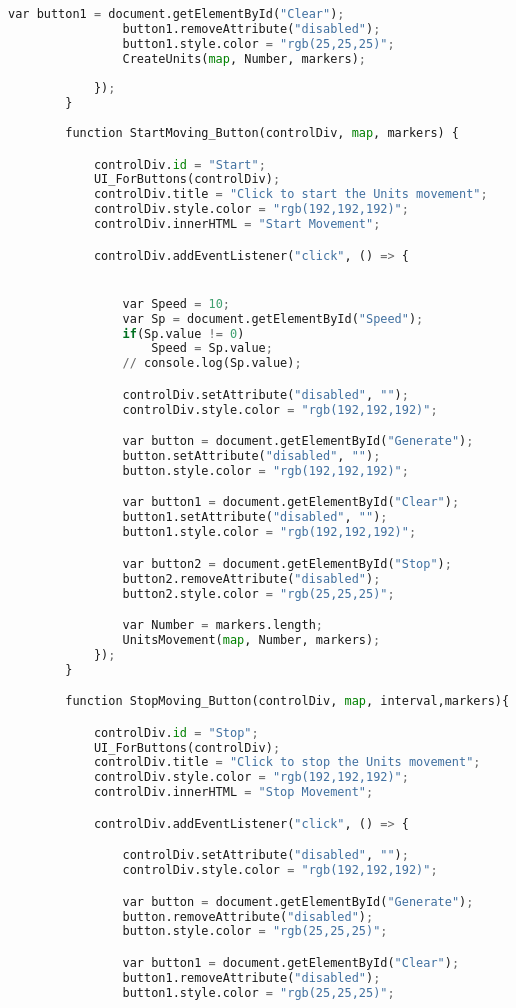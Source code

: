 \documentclass[a4paper]{article}
\begin{document}
\begin{lstlisting}[language=python,tabsize = 1,breaklines=true, breakatwhitespace=false,frame=single]
				var button1 = document.getElementById("Clear");
				button1.removeAttribute("disabled");
				button1.style.color = "rgb(25,25,25)";
				CreateUnits(map, Number, markers);
						
			});
		}
	
		function StartMoving_Button(controlDiv, map, markers) {

			controlDiv.id = "Start";
			UI_ForButtons(controlDiv);
			controlDiv.title = "Click to start the Units movement";
			controlDiv.style.color = "rgb(192,192,192)";
			controlDiv.innerHTML = "Start Movement";

			controlDiv.addEventListener("click", () => {


				var Speed = 10;
				var Sp = document.getElementById("Speed");
				if(Sp.value != 0)
					Speed = Sp.value;
				// console.log(Sp.value);

				controlDiv.setAttribute("disabled", "");
				controlDiv.style.color = "rgb(192,192,192)";

				var button = document.getElementById("Generate");
				button.setAttribute("disabled", "");
				button.style.color = "rgb(192,192,192)";

				var button1 = document.getElementById("Clear");
				button1.setAttribute("disabled", "");
				button1.style.color = "rgb(192,192,192)";

				var button2 = document.getElementById("Stop");
				button2.removeAttribute("disabled");
				button2.style.color = "rgb(25,25,25)";

				var Number = markers.length;
				UnitsMovement(map, Number, markers);
			});
		}

		function StopMoving_Button(controlDiv, map, interval,markers){

			controlDiv.id = "Stop";
			UI_ForButtons(controlDiv);
			controlDiv.title = "Click to stop the Units movement";
			controlDiv.style.color = "rgb(192,192,192)";
			controlDiv.innerHTML = "Stop Movement";

			controlDiv.addEventListener("click", () => {

				controlDiv.setAttribute("disabled", "");
				controlDiv.style.color = "rgb(192,192,192)";

				var button = document.getElementById("Generate");
				button.removeAttribute("disabled");
				button.style.color = "rgb(25,25,25)";

				var button1 = document.getElementById("Clear");
				button1.removeAttribute("disabled");
				button1.style.color = "rgb(25,25,25)";


\end{lstlisting}
\end{document}
